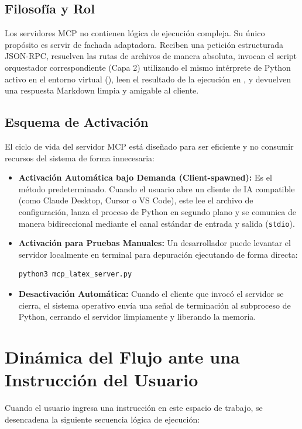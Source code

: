 \documentclass[12pt,a4paper]{article}
\begin{document}
\subsection{Filosofía y Rol}
Los servidores MCP no contienen lógica de ejecución compleja. Su único propósito es servir de fachada adaptadora. Reciben una petición estructurada JSON-RPC, resuelven las rutas de archivos de manera absoluta, invocan el script orquestador correspondiente (Capa 2) utilizando el mismo intérprete de Python activo en el entorno virtual (), leen el resultado de la ejecución en , y devuelven una respuesta Markdown limpia y amigable al cliente.

\subsection{Esquema de Activación}
El ciclo de vida del servidor MCP está diseñado para ser eficiente y no consumir recursos del sistema de forma innecesaria:
\begin{itemize}
    \item \textbf{Activación Automática bajo Demanda (Client-spawned):} Es el método predeterminado. Cuando el usuario abre un cliente de IA compatible (como Claude Desktop, Cursor o VS Code), este lee el archivo de configuración, lanza el proceso de Python en segundo plano y se comunica de manera bidireccional mediante el canal estándar de entrada y salida (\texttt{stdio}).
    \item \textbf{Activación para Pruebas Manuales:} Un desarrollador puede levantar el servidor localmente en terminal para depuración ejecutando de forma directa:
    \begin{lstlisting}[language=bash]
python3 mcp_latex_server.py
    \end{lstlisting}
    \item \textbf{Desactivación Automática:} Cuando el cliente que invocó el servidor se cierra, el sistema operativo envía una señal de terminación al subproceso de Python, cerrando el servidor limpiamente y liberando la memoria.
\end{itemize}

\section{Dinámica del Flujo ante una Instrucción del Usuario}

Cuando el usuario ingresa una instrucción en este espacio de trabajo, se desencadena la siguiente secuencia lógica de ejecución:
\end{document}
